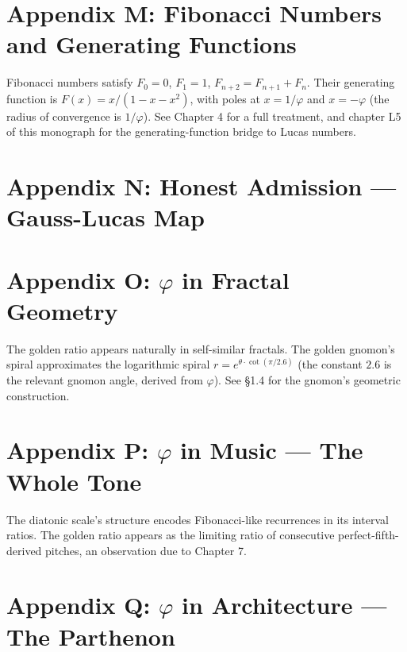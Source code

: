 \section*{Appendix M: Fibonacci Numbers and Generating Functions}
\label{fa_01:sec:01-app-M}

Fibonacci numbers satisfy $F_0 = 0$, $F_1 = 1$, $F_{n+2} = F_{n+1} +
F_n$. Their generating function is $F(x) = x / (1 - x - x^2)$, with
poles at $x = 1/\varphi$ and $x = -\varphi$ (the radius of
convergence is $1/\varphi$). See \cite{koshy_fib_lucas} Chapter 4
for a full treatment, and chapter L5 of this monograph for the
generating-function bridge to Lucas numbers.

\section*{Appendix N: Honest Admission --- Gauss-Lucas Map}
\label{fa_01:sec:01-app-N}


\section*{Appendix O: $\varphi$ in Fractal Geometry}
\label{fa_01:sec:01-app-O}

The golden ratio appears naturally in self-similar fractals. The
golden gnomon's spiral approximates the logarithmic spiral $r =
e^{\theta \cdot \cot(\pi/2.6)}$ (the constant $2.6$ is the relevant
gnomon angle, derived from $\varphi$). See
\cite{coxeter_regular_polytopes} \S 1.4 for the gnomon's geometric
construction.

\section*{Appendix P: $\varphi$ in Music --- The Whole Tone}
\label{fa_01:sec:01-app-P}

The diatonic scale's structure encodes Fibonacci-like recurrences in
its interval ratios. The golden ratio appears as the limiting ratio
of consecutive perfect-fifth-derived pitches, an observation due to
\cite{livio_phi} Chapter 7.

\section*{Appendix Q: $\varphi$ in Architecture --- The Parthenon}
\label{fa_01:sec:01-app-Q}

